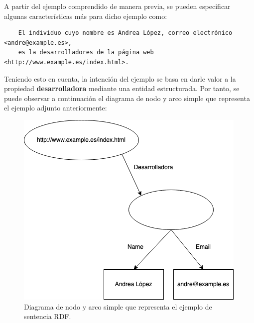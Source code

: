 \documentclass[11pt]{report}
\begin{document}

A partir del ejemplo comprendido de manera previa, se pueden especificar algunas características más para dicho ejemplo como:

\begin{verbatim}
	El individuo cuyo nombre es Andrea López, correo electrónico <andre@example.es>, 
	es la desarrolladores de la página web <http://www.example.es/index.html>.
\end{verbatim}

Teniendo esto en cuenta, la intención del ejemplo se basa en darle valor a la propiedad \textbf{desarrolladora} mediante una entidad estructurada. Por tanto, se puede observar a continuación el diagrama de nodo y arco simple que representa el ejemplo adjunto anteriormente:

\begin{figure}[H]
	\centering
	\includegraphics[scale=0.7]{../img/Propiedad-Estructurada.png}
	\caption{Diagrama de nodo y arco simple que representa el ejemplo de sentencia RDF.}
	\label{fig:Diagrama-Nodo-Arco-2}
\end{figure}

\end{document}
